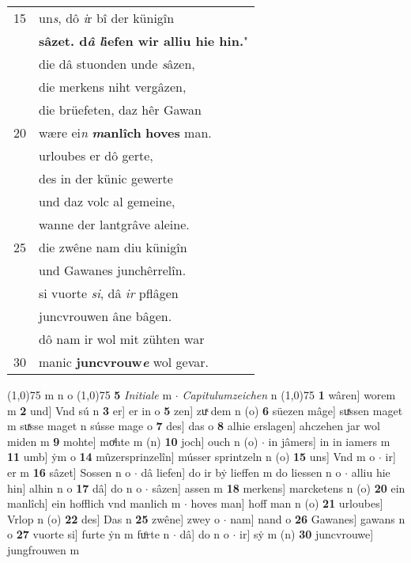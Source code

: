 \documentclass[8pt,a4paper,notitlepage]{article}
\begin{document}
\begin{table}[ht]
\begin{minipage}[t]{0.5\linewidth}
\begin{tabular}{rl}
15 & un\textit{s}, dô \textit{i}r bî der künigîn\\ 
 & \textbf{sâzet. d\textit{â} \textit{l}iefen wir alliu hie hin.}"\\ 
 & die dâ stuonden unde \textit{s}âzen,\\ 
 & die merkens niht vergâzen,\\ 
 & die brüefeten, daz hêr Gawan\\ 
20 & wære ei\textit{n} \textbf{\textit{m}anlîch} \textbf{hoves} man.\\ 
 & urloubes er dô gerte,\\ 
 & des in der künic gewerte\\ 
 & und daz volc al gemeine,\\ 
 & wanne der lantgrâve aleine.\\ 
25 & die zwêne nam diu künigîn\\ 
 & und Gawanes junchêrrelîn.\\ 
 & si vuorte \textit{si}, dâ \textit{ir} pflâgen\\ 
 & juncvrouwen âne bâgen.\\ 
 & dô nam ir wol mit zühten war\\ 
30 & manic \textbf{juncvrouw\textit{e}} wol gevar.\\ 
\end{tabular}
\scriptsize
\line(1,0){75} \newline
m n o \newline
\line(1,0){75} \newline
\textbf{5} \textit{Initiale} m   $\cdot$ \textit{Capitulumzeichen} n  \newline
\line(1,0){75} \newline
\textbf{1} wâren] worem m \textbf{2} und] Vnd sú n \textbf{3} er] er in o \textbf{5} zen] zuͯ dem n (o) \textbf{6} süezen mâge] suͯssen maget m suͯsse maget n sússe mage o \textbf{7} des] das o \textbf{8} alhie erslagen] ahczehen jar wol miden m \textbf{9} mohte] moͯhte m (n) \textbf{10} joch] ouch n (o)  $\cdot$ in jâmers] in in iamers m \textbf{11} umb] ẏm o \textbf{14} mûzersprinzelîn] músser sprintzeln n (o) \textbf{15} uns] Vnd m o  $\cdot$ ir] er m \textbf{16} sâzet] Sossen n o  $\cdot$ dâ liefen] do ir bẏ lieffen m do liessen n o  $\cdot$ alliu hie hin] alhin n o \textbf{17} dâ] do n o  $\cdot$ sâzen] assen m \textbf{18} merkens] marcketens n (o) \textbf{20} ein manlîch] ein hofflich vnd manlich m  $\cdot$ hoves man] hoff man n (o) \textbf{21} urloubes] Vrlop n (o) \textbf{22} des] Das n \textbf{25} zwêne] zwey o  $\cdot$ nam] nand o \textbf{26} Gawanes] gawans n o \textbf{27} vuorte si] furte ẏn m fuͦrte n  $\cdot$ dâ] do n o  $\cdot$ ir] sẏ m (n) \textbf{30} juncvrouwe] jungfrouwen m \newline
\end{minipage}
\end{table}
\end{document}
